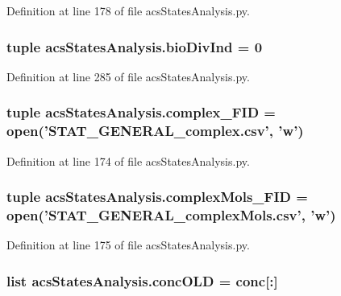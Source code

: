 Definition at line 178 of file acs\-States\-Analysis.\-py.

\hypertarget{a00130_a247328d05f06695b0c2de9a001ca4548}{
\subsubsection[{bio\-Div\-Ind}]{\setlength{\rightskip}{0pt plus 5cm}tuple acs\-States\-Analysis.\-bio\-Div\-Ind = 0}}\label{a00130_a247328d05f06695b0c2de9a001ca4548}


Definition at line 285 of file acs\-States\-Analysis.\-py.

\hypertarget{a00130_ace41560d233dff88c3073be734bae944}{
\subsubsection[{complex\-\_\-\-F\-I\-D}]{\setlength{\rightskip}{0pt plus 5cm}tuple acs\-States\-Analysis.\-complex\-\_\-\-F\-I\-D = open('S\-T\-A\-T\-\_\-\-G\-E\-N\-E\-R\-A\-L\-\_\-complex.\-csv', 'w')}}\label{a00130_ace41560d233dff88c3073be734bae944}


Definition at line 174 of file acs\-States\-Analysis.\-py.

\hypertarget{a00130_a2ef28958c50aabe7867b32f8dd6f4ace}{
\subsubsection[{complex\-Mols\-\_\-\-F\-I\-D}]{\setlength{\rightskip}{0pt plus 5cm}tuple acs\-States\-Analysis.\-complex\-Mols\-\_\-\-F\-I\-D = open('S\-T\-A\-T\-\_\-\-G\-E\-N\-E\-R\-A\-L\-\_\-complex\-Mols.\-csv', 'w')}}\label{a00130_a2ef28958c50aabe7867b32f8dd6f4ace}


Definition at line 175 of file acs\-States\-Analysis.\-py.

\hypertarget{a00130_a15f99c617a2dc95e52f741ee99e71b7a}{
\subsubsection[{conc\-O\-L\-D}]{\setlength{\rightskip}{0pt plus 5cm}list acs\-States\-Analysis.\-conc\-O\-L\-D = {\bf conc}\mbox{[}\-:\mbox{]}}}\label{a00130_a15f99c617a2dc95e52f741ee99e71b7a}


